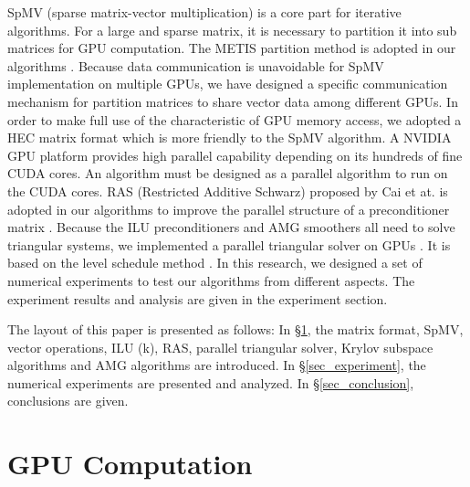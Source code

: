 \documentclass[runningheads,a4paper]{llncs}
\begin{document}
{SpMV (sparse matrix-vector multiplication) is a core part for iterative algorithms. For a large and sparse matrix, it is necessary to partition it into sub matrices for GPU computation. The METIS partition method is adopted in our algorithms \cite{metis}.  Because data communication is unavoidable for SpMV implementation on multiple GPUs, we have designed a specific communication mechanism for partition matrices to share vector data among different GPUs. In order to make full use of the characteristic of GPU memory access, we adopted a HEC matrix format which is more friendly to the SpMV algorithm. A NVIDIA GPU platform provides high parallel capability depending on its hundreds of fine CUDA cores. An algorithm must be designed as a parallel algorithm to run on the CUDA cores. RAS (Restricted Additive Schwarz) proposed by Cai et at. is adopted in our algorithms to improve the parallel structure of a preconditioner matrix \cite{cai}. Because the ILU preconditioners and AMG smoothers all need to solve triangular systems, we implemented a parallel triangular solver on GPUs \cite{spmv-uc}. It is based on the level schedule method \cite{saad,LS_gpil}. In this research, we designed a set of numerical experiments to test our algorithms from different aspects. The experiment results and analysis are given in the experiment section.

The layout of this paper is presented as follows:
In \S \ref{sec_gpu_computation}, the matrix format, SpMV, vector operations, ILU (k), RAS, parallel triangular solver, Krylov subspace algorithms and AMG algorithms are introduced.
In \S \ref{sec_experiment}, the numerical experiments are presented and analyzed.
In \S \ref{sec_conclusion}, conclusions are given.

\section{GPU Computation}
\label{sec_gpu_computation}

}
\end{document}
